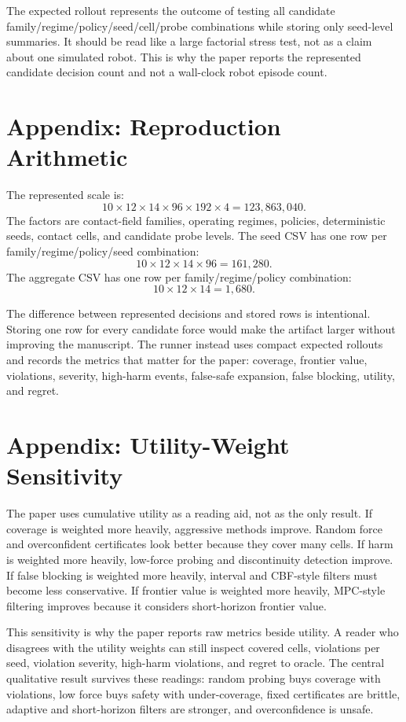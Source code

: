 \documentclass{article}
\begin{document}
The expected rollout represents the outcome of testing all candidate
family/regime/policy/seed/cell/probe combinations while storing only seed-level
summaries. It should be read like a large factorial stress test, not as a claim
about one simulated robot. This is why the paper reports the represented
candidate decision count and not a wall-clock robot episode count.

\section{Appendix: Reproduction Arithmetic}

The represented scale is:
\[
  10 \times 12 \times 14 \times 96 \times 192 \times 4
  = 123{,}863{,}040.
\]
The factors are contact-field families, operating regimes, policies,
deterministic seeds, contact cells, and candidate probe levels. The seed CSV
has one row per family/regime/policy/seed combination:
\[
  10 \times 12 \times 14 \times 96 = 161{,}280.
\]
The aggregate CSV has one row per family/regime/policy combination:
\[
  10 \times 12 \times 14 = 1{,}680.
\]

The difference between represented decisions and stored rows is intentional.
Storing one row for every candidate force would make the artifact larger
without improving the manuscript. The runner instead uses compact expected
rollouts and records the metrics that matter for the paper: coverage,
frontier value, violations, severity, high-harm events, false-safe expansion,
false blocking, utility, and regret.

\section{Appendix: Utility-Weight Sensitivity}

The paper uses cumulative utility as a reading aid, not as the only result. If
coverage is weighted more heavily, aggressive methods improve. Random force
and overconfident certificates look better because they cover many cells. If
harm is weighted more heavily, low-force probing and discontinuity detection
improve. If false blocking is weighted more heavily, interval and CBF-style
filters must become less conservative. If frontier value is weighted more
heavily, MPC-style filtering improves because it considers short-horizon
frontier value.

This sensitivity is why the paper reports raw metrics beside utility. A reader
who disagrees with the utility weights can still inspect covered cells,
violations per seed, violation severity, high-harm violations, and regret to
oracle. The central qualitative result survives these readings: random probing
buys coverage with violations, low force buys safety with under-coverage, fixed
certificates are brittle, adaptive and short-horizon filters are stronger, and
overconfidence is unsafe.
\end{document}
